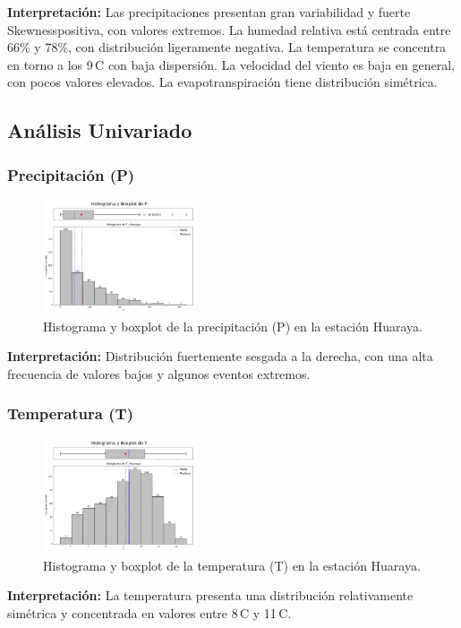 \textbf{Interpretación:} Las precipitaciones presentan gran variabilidad y fuerte Skewnesspositiva, con valores extremos. La humedad relativa está centrada entre 66\% y 78\%, con distribución ligeramente negativa. La temperatura se concentra en torno a los 9\,\textdegree C con baja dispersión. La velocidad del viento es baja en general, con pocos valores elevados. La evapotranspiración tiene distribución simétrica.

\subsection{Análisis Univariado}

\subsubsection*{Precipitación (P)}
\begin{figure}[H]
\centering
\includegraphics[width=0.4\textwidth]{resultados/por_estacion_meteorologica/Huaraya/P_histograma.png}
\caption{Histograma y boxplot de la precipitación (P) en la estación Huaraya.}
\label{fig:huaraya_P}
\end{figure}
\textbf{Interpretación:} Distribución fuertemente sesgada a la derecha, con una alta frecuencia de valores bajos y algunos eventos extremos.

\subsubsection*{Temperatura (T)}
\begin{figure}[H]
\centering
\includegraphics[width=0.4\textwidth]{resultados/por_estacion_meteorologica/Huaraya/T_histograma.png}
\caption{Histograma y boxplot de la temperatura (T) en la estación Huaraya.}
\label{fig:huaraya_T}
\end{figure}
\textbf{Interpretación:} La temperatura presenta una distribución relativamente simétrica y concentrada en valores entre 8\,\textdegree C y 11\,\textdegree C.

